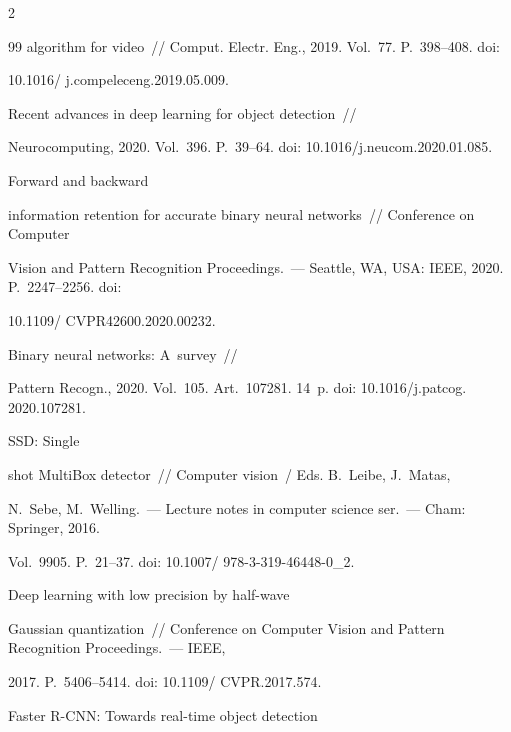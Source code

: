 \begin{multicols}{2}
{{\begin{thebibliography}{99}
algorithm for video~// Comput. Electr. Eng., 2019. Vol.~77. P.~398--408. doi: 


10.1016/ j.compeleceng.2019.05.009.




 Recent advances in deep learning for object detection~// 


Neurocomputing, 2020. Vol.~396. P.~39--64. doi: 10.1016/j.neucom.2020.01.085.




  Forward and backward 


information retention for accurate binary neural networks~// Conference on Computer 


Vision and Pattern Recognition Proceedings.~--- Seattle, WA, USA: IEEE, 2020. P.~2247--2256. doi: 


10.1109/ CVPR42600.2020.00232.




 Binary neural networks: A~survey~// 


Pattern Recogn., 2020. Vol.~105. Art.~107281. 14~p. doi: 10.1016/j.patcog. 2020.107281.







  SSD: Single 


shot MultiBox detector~// Computer vision~/ Eds. B.~Leibe, J.~Matas, 


N.~Sebe, M.~Welling.~--- Lecture notes in computer science ser.~--- Cham: Springer, 2016. 


Vol.~9905. P.~21--37. doi: 10.1007/ 978-3-319-46448-0\_2.




 Deep learning with low precision by half-wave 


Gaussian quantization~// Conference on Computer Vision and Pattern Recognition Proceedings.~--- IEEE, 


2017. P.~5406--5414. doi: 10.1109/ CVPR.2017.574.




 Faster \mbox{R-CNN}: Towards real-time object detection 



\end{thebibliography}}}
\end{multicols}
